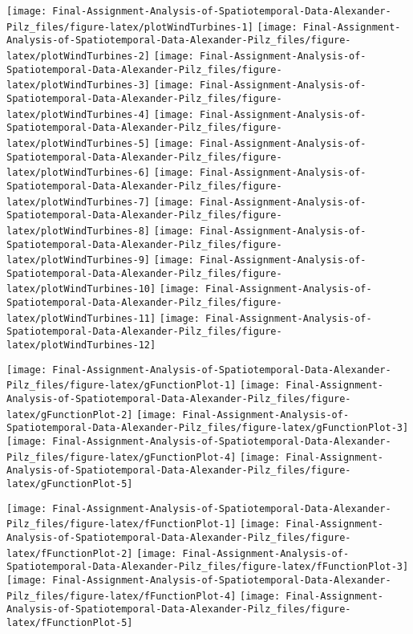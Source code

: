 \documentclass[
]{article}
\begin{document}
\texttt{[image: Final-Assignment-Analysis-of-Spatiotemporal-Data-Alexander-Pilz\_files/figure-latex/plotWindTurbines-1]}
\texttt{[image: Final-Assignment-Analysis-of-Spatiotemporal-Data-Alexander-Pilz\_files/figure-latex/plotWindTurbines-2]}
\texttt{[image: Final-Assignment-Analysis-of-Spatiotemporal-Data-Alexander-Pilz\_files/figure-latex/plotWindTurbines-3]}
\texttt{[image: Final-Assignment-Analysis-of-Spatiotemporal-Data-Alexander-Pilz\_files/figure-latex/plotWindTurbines-4]}
\texttt{[image: Final-Assignment-Analysis-of-Spatiotemporal-Data-Alexander-Pilz\_files/figure-latex/plotWindTurbines-5]}
\texttt{[image: Final-Assignment-Analysis-of-Spatiotemporal-Data-Alexander-Pilz\_files/figure-latex/plotWindTurbines-6]}
\texttt{[image: Final-Assignment-Analysis-of-Spatiotemporal-Data-Alexander-Pilz\_files/figure-latex/plotWindTurbines-7]}
\texttt{[image: Final-Assignment-Analysis-of-Spatiotemporal-Data-Alexander-Pilz\_files/figure-latex/plotWindTurbines-8]}
\texttt{[image: Final-Assignment-Analysis-of-Spatiotemporal-Data-Alexander-Pilz\_files/figure-latex/plotWindTurbines-9]}
\texttt{[image: Final-Assignment-Analysis-of-Spatiotemporal-Data-Alexander-Pilz\_files/figure-latex/plotWindTurbines-10]}
\texttt{[image: Final-Assignment-Analysis-of-Spatiotemporal-Data-Alexander-Pilz\_files/figure-latex/plotWindTurbines-11]}
\texttt{[image: Final-Assignment-Analysis-of-Spatiotemporal-Data-Alexander-Pilz\_files/figure-latex/plotWindTurbines-12]}

\texttt{[image: Final-Assignment-Analysis-of-Spatiotemporal-Data-Alexander-Pilz\_files/figure-latex/gFunctionPlot-1]}
\texttt{[image: Final-Assignment-Analysis-of-Spatiotemporal-Data-Alexander-Pilz\_files/figure-latex/gFunctionPlot-2]}
\texttt{[image: Final-Assignment-Analysis-of-Spatiotemporal-Data-Alexander-Pilz\_files/figure-latex/gFunctionPlot-3]}
\texttt{[image: Final-Assignment-Analysis-of-Spatiotemporal-Data-Alexander-Pilz\_files/figure-latex/gFunctionPlot-4]}
\texttt{[image: Final-Assignment-Analysis-of-Spatiotemporal-Data-Alexander-Pilz\_files/figure-latex/gFunctionPlot-5]}

\texttt{[image: Final-Assignment-Analysis-of-Spatiotemporal-Data-Alexander-Pilz\_files/figure-latex/fFunctionPlot-1]}
\texttt{[image: Final-Assignment-Analysis-of-Spatiotemporal-Data-Alexander-Pilz\_files/figure-latex/fFunctionPlot-2]}
\texttt{[image: Final-Assignment-Analysis-of-Spatiotemporal-Data-Alexander-Pilz\_files/figure-latex/fFunctionPlot-3]}
\texttt{[image: Final-Assignment-Analysis-of-Spatiotemporal-Data-Alexander-Pilz\_files/figure-latex/fFunctionPlot-4]}
\texttt{[image: Final-Assignment-Analysis-of-Spatiotemporal-Data-Alexander-Pilz\_files/figure-latex/fFunctionPlot-5]}
\end{document}
